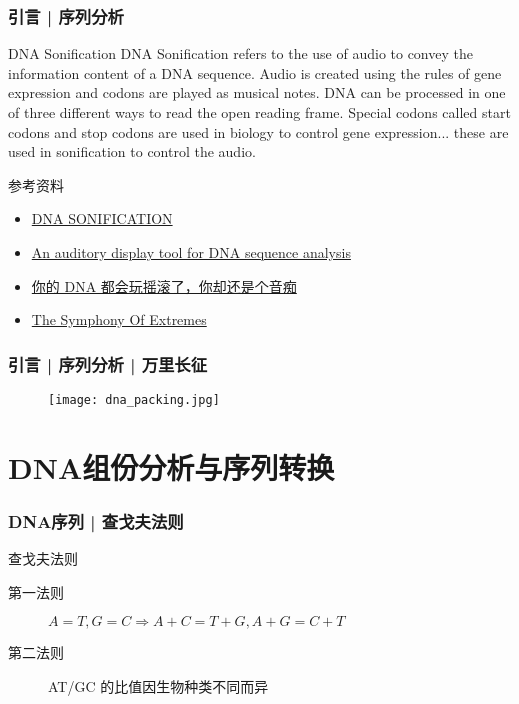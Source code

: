 \begin{frame}
  \frametitle{引言 | 序列分析}
  \begin{block}{DNA Sonification}
    DNA Sonification refers to the use of audio to convey the information content of a DNA sequence. Audio is created using the rules of gene expression and codons are played as musical notes. DNA can be processed in one of three different ways to read the open reading frame. Special codons called start codons and stop codons are used in biology to control gene expression... these are used in sonification to control the audio.
  \end{block}
  \begin{block}{参考资料}
    \begin{itemize}
      \item \href{http://dnasonification.org/index.html}{DNA SONIFICATION}
      \item \href{https://bmcbioinformatics.biomedcentral.com/articles/10.1186/s12859-017-1632-x}{An auditory display tool for DNA sequence analysis}
      \item \href{https://cloud.tencent.com/developer/article/1371570}{你的 DNA 都会玩摇滚了，你却还是个音痴}
      \item \href{https://v.qq.com/x/page/o07866zm5l9.html?start=84}{The Symphony Of Extremes}
    \end{itemize}
  \end{block}
\end{frame}

\begin{frame}
  \frametitle{引言 | 序列分析 | 万里长征}
  \begin{figure}
    \centering
    \texttt{[image: dna\_packing.jpg]}
  \end{figure}
\end{frame}

\section{DNA组份分析与序列转换}
\begin{frame}
  \frametitle{DNA序列 | 查戈夫法则}
  \begin{block}{查戈夫法则}
    \begin{description}
      \item[第一法则]$A=T, G=C \Longrightarrow A+C=T+G, A+G=C+T$
      \item[第二法则]AT/GC 的比值因生物种类不同而异
    \end{description}
  \end{block}
\end{frame}

